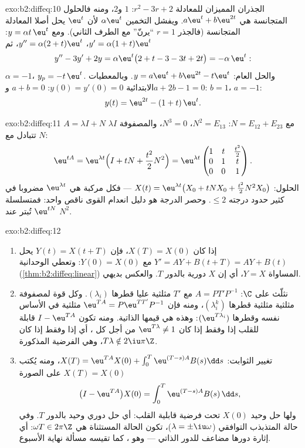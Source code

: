 \begin{solution}{exo:b2:diffeq:10}
الجذران المميزان للمعادلة $r^2 - 3r + 2$: $1$ و$2$، ومنه فالحلول
المتجانسة هي $a\eu^t + b\eu^{2t}$. ويفشل التخمين $\alpha\eu^t$ لأن $\eu^t$ يحل أصلا
المعادلة المتجانسة (فالجذر $r = 1$ ``يرنّ'' مع الطرف الثاني). ومع
$y = \alpha t\,\eu^t$: $y' = \alpha(1 +
t)\eu^t$، $y'' = \alpha(2 + t)\eu^t$، ثم
\[
y'' - 3y' + 2y = \alpha\eu^t\bigl(2 + t - 3 - 3t + 2t\bigr)
= -\alpha\,\eu^t :
\]
$\alpha = -1$، $y_p = -t\,\eu^t$. والحل العام: $y = a\eu^t
+ b\eu^{2t} - t\eu^t$. وبالمعطيات الابتدائية $y(0) = y'(0) = 0$:
$a + b
= 0$ و$a + 2b - 1 = 0$: $b = 1$، $a = -1$:
\[
y(t) = \eu^{2t} - (1 + t)\,\eu^{t} .
\]

\end{solution}

\begin{solution}{exo:b2:diffeq:11}
$A = \lambda I + N$ مع $N = E_{12} + E_{23}$: $N^2 = E_{13}$، $N^3 = 0$، والمصفوفة $\lambda I$ تتبادل مع
$N$:
\[
\eu^{tA} = \eu^{\lambda t}\Bigl(I + tN +
\frac{t^2}{2}N^2\Bigr)
= \eu^{\lambda t}\begin{pmatrix}
1 & t & \frac{t^2}{2}\\
0 & 1 & t\\
0 & 0 & 1
\end{pmatrix}.
\]
الحلول: $X(t) = \eu^{\lambda t}\bigl(X_0 + tNX_0 +
\frac{t^2}2N^2X_0\bigr)$ --- فكل مركبة هي $\eu^{\lambda
t}$ مضروبا في كثير حدود درجته
$\leq 2$. وحصر الدرجة هو دليل انعدام القوى ناقص واحد: فمتسلسلة $\eu^{tN}$
تُبتر عند $N^2$.
\end{solution}

\begin{solution}{exo:b2:diffeq:12}
\begin{enumerate}
  \item إذا كان $X(T) = X(0)$، فإن $Y(t) = X(t + T)$ يحل $Y' =
        AY + B(t + T) = AY + B(t)$ مع $Y(0) = X(0)$: وتعطي
        الوحدانية (\cref{thm:b2:diffeq:linear}) المساواة $Y = X$، أي إن $X$ دورية
        بالدور $T$. والعكس بديهي.
  \item نثلّث على $\C$: $A = PT'P^{-1}$ مع $T'$ مثلثية عليا قطرها
        $(\lambda_i)$. وكل قوة لمصفوفة مثلثية مثلثية قطرها $(\lambda_i^k)$، ومنه فإن
        $\eu^{TA} = P\eu^{TT'}P^{-1}$ مثلثية في الأساس نفسه وقطرها
        $(\eu^{T\lambda_i})$: وهذه هي قيمها الذاتية. ومنه تكون
        $I - \eu^{TA}$ قابلة للقلب إذا وفقط إذا كان $\eu^{T\lambda} \neq
        1$ من أجل كل ، أي إذا وفقط إذا كان $T\lambda \notin
        2\iu\pi\Z$، وهي الفرضية المذكورة.
  \item تغيير الثوابت: $X(T) = \eu^{TA}X(0) +
        \int_0^T\eu^{(T-s)A}B(s)\dd s$، ومنه يُكتب $X(T) = X(0)$ على الصورة
        \[
        \bigl(I - \eu^{TA}\bigr)X(0) =
        \int_0^{T}\eu^{(T-s)A}B(s)\,\dd s ,
        \]
        ولها حل وحيد $X(0)$ تحت فرضية قابلية القلب: أي حل دوري وحيد
        بالدور $T$. وفي حالة المتذبذب التوافقي ($\lambda =
        \pm\iu\omega$)، تكون
        الحالة المستثناة هي $\omega T \in
        2\pi\Z$: أي إثارة دورها مضاعف للدور
        الذاتي --- وهو ، كما تقيسه مسألة نهاية الأسبوع.
\end{enumerate}
\end{solution}

